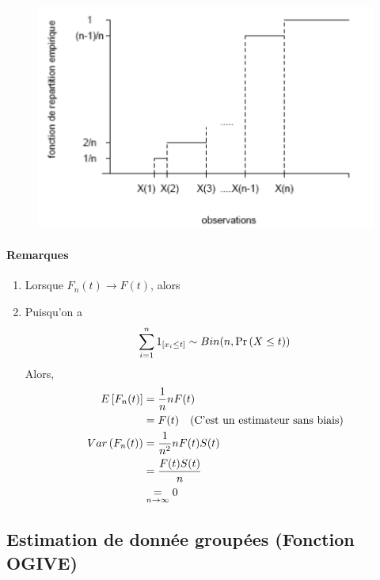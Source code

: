 \documentclass[12pt, french]{report}
\begin{document}
\begin{figure}[!h]
	\centering
	\includegraphics[scale=0.4]{Figures/Fct_de_repartition_empirique.png}
 \end{figure}

\paragraph{Remarques}
\begin{enumerate}[label=(\arabic*)]
\item Lorsque $F_n(t) \to F(t)$, alors

\item Puisqu'on a
\begin{align*}
\sum_{i=1}^{n} 1_{[x_i \leq t]} \sim Bin(n,\Pr \left( X \leq t \right))
\end{align*}
Alors,
\begin{align*}
E \left[ F_n(t) \right]		& = \frac{1}{n} n F(t) \\
	& = F(t) \quad \text{(C'est un estimateur sans biais)} \\
Var \left( F_n(t) \right) & = \frac{1}{n^2}  n F(t) S(t) \\
	& = \frac{F(t) S(t)}{n}	\\
	& \underset{n \to \infty}{=} 0 \\
\end{align*}
\end{enumerate}

\subsection{Estimation de donnée groupées (Fonction OGIVE)}
\end{document}

